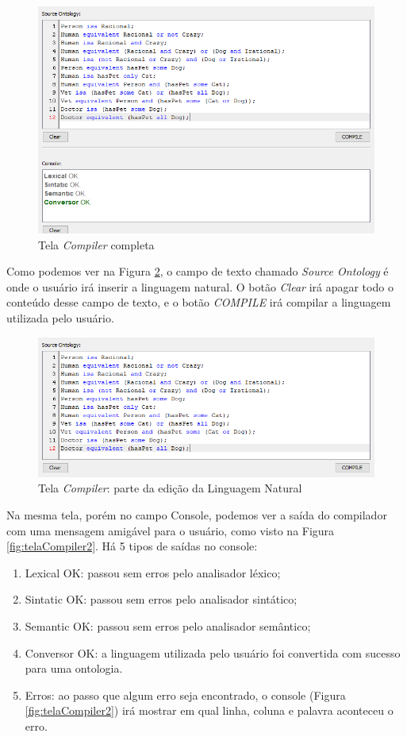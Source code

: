 \documentclass{bcc}
\begin{document}
\begin{figure}[H]
\centering
\includegraphics[width=.7\textwidth]{Figuras/tela_compiler.png}
\caption{Tela \textit{Compiler} completa}
\label{fig:telaCompiler}
\end{figure}

Como podemos ver na Figura \ref{fig:telaCompiler1}, o campo de texto chamado \textit{Source Ontology} é onde o usuário irá inserir a linguagem natural. O botão \textit{Clear} irá apagar todo o conteúdo desse campo de texto, e o botão \textit{COMPILE} irá compilar a linguagem utilizada pelo usuário. 

\begin{figure}[H]
\centering
\includegraphics[width=.7\textwidth]{Figuras/tela_compiler1.png}
\caption{Tela \textit{Compiler}: parte da edição da Linguagem Natural}
\label{fig:telaCompiler1}
\end{figure}

Na mesma tela, porém no campo Console, podemos ver a saída do compilador com uma mensagem amigável para o usuário, como visto na Figura \ref{fig:telaCompiler2}. Há 5 tipos de saídas no console: 

\begin{enumerate}
  \item Lexical OK: passou sem erros pelo analisador léxico;
  \item Sintatic OK: passou sem erros pelo analisador sintático;
  \item Semantic OK: passou sem erros pelo analisador semântico;
  \item Conversor OK: a linguagem utilizada pelo usuário foi convertida com sucesso para uma ontologia.
  \item Erros: ao passo que algum erro seja encontrado, o console (Figura \ref{fig:telaCompiler2}) irá mostrar em qual linha, coluna e palavra aconteceu o erro.
\end{enumerate}
\end{document}
